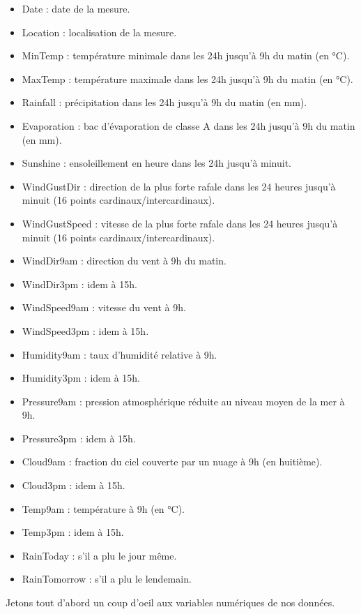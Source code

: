 \documentclass{article}
\begin{document}
\begin{itemize}
    \item Date : date de la mesure.
    \item Location : localisation de la mesure.
    \item MinTemp : température minimale dans les 24h jusqu'à 9h du matin (en °C).
    \item MaxTemp : température maximale dans les 24h jusqu'à 9h du matin (en °C).
    \item Rainfall : précipitation dans les 24h jusqu'à 9h du matin (en mm).
    \item Evaporation : bac d'évaporation de classe A dans les 24h jusqu'à 9h du matin (en mm).
    \item Sunshine : ensoleillement en heure dans les 24h jusqu'à minuit.
    \item WindGustDir : direction de la plus forte rafale dans les 24 heures jusqu'à minuit (16 points cardinaux/intercardinaux).   
    \item WindGustSpeed : vitesse de la plus forte rafale dans les 24 heures jusqu'à minuit (16 points cardinaux/intercardinaux).
    \item WindDir9am : direction du vent à 9h du matin.
    \item WindDir3pm : idem à 15h.
    \item WindSpeed9am : vitesse du vent à 9h.
    \item WindSpeed3pm : idem à 15h.
    \item Humidity9am : taux d'humidité relative à 9h.
    \item Humidity3pm : idem à 15h.
    \item Pressure9am : pression atmosphérique réduite au niveau moyen de la mer à 9h.
    \item Pressure3pm : idem à 15h.
    \item Cloud9am : fraction du ciel couverte par un nuage à 9h (en huitième).   
    \item Cloud3pm : idem à 15h.
    \item Temp9am : température à 9h (en °C).
    \item Temp3pm : idem à 15h.
    \item RainToday : s'il a plu le jour même.
    \item RainTomorrow : s'il a plu le lendemain.   
\end{itemize}

Jetons tout d'abord un coup d'oeil aux variables numériques de nos données. 
\end{document}
